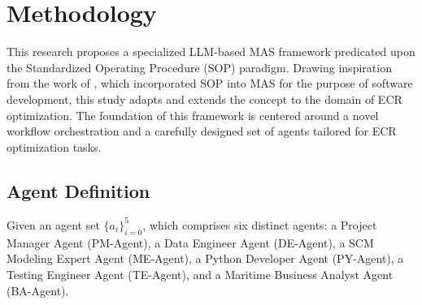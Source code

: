 \documentclass[preprint,12pt]{elsarticle}
\begin{document}
\section{Methodology}

This research proposes a specialized LLM-based MAS framework predicated upon the Standardized Operating Procedure (SOP) paradigm. Drawing inspiration from the work of \cite{hongMetaGPTMetaProgramming2024d}, which incorporated SOP into MAS for the purpose of software development, this study adapts and extends the concept to the domain of ECR  optimization. The foundation of this framework is centered around a novel workflow orchestration and a carefully designed set of agents tailored for ECR optimization tasks.

\subsection{Agent Definition}
Given an agent set $\{a_i\}_{i=0}^5$, which comprises six distinct agents: a Project Manager Agent (PM-Agent), a Data Engineer Agent (DE-Agent), a SCM Modeling Expert Agent (ME-Agent), a Python Developer Agent (PY-Agent), a Testing Engineer Agent (TE-Agent), and a Maritime Business Analyst Agent (BA-Agent).
\end{document}
